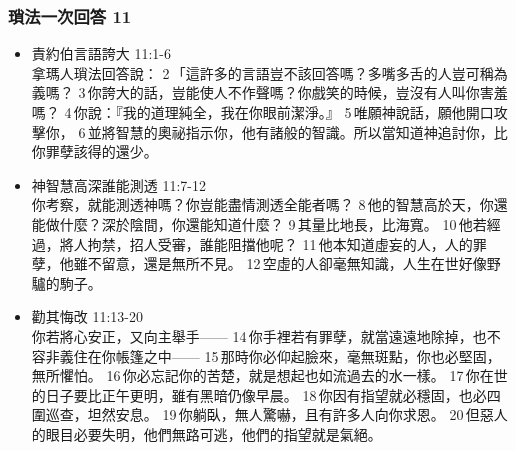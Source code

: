 \subsubsection{瑣法一次回答 11}
\begin{itemize}
\itemsep-.45em 
\item 責約伯言語誇大 11:1-6\\
拿瑪人瑣法回答說： 2 「這許多的言語豈不該回答嗎？多嘴多舌的人豈可稱為義嗎？ 3 你誇大的話，豈能使人不作聲嗎？你戲笑的時候，豈沒有人叫你害羞嗎？ 4 你說：『我的道理純全，我在你眼前潔淨。』 5 唯願神說話，願他開口攻擊你， 6 並將智慧的奧祕指示你，他有諸般的智識。所以當知道神追討你，比你罪孽該得的還少。
\item 神智慧高深誰能測透 11:7-12\\
你考察，就能測透神嗎？你豈能盡情測透全能者嗎？ 8 他的智慧高於天，你還能做什麼？深於陰間，你還能知道什麼？ 9 其量比地長，比海寬。 10 他若經過，將人拘禁，招人受審，誰能阻擋他呢？ 11 他本知道虛妄的人，人的罪孽，他雖不留意，還是無所不見。 12 空虛的人卻毫無知識，人生在世好像野驢的駒子。
\item 勸其悔改 11:13-20\\
你若將心安正，又向主舉手—— 14 你手裡若有罪孽，就當遠遠地除掉，也不容非義住在你帳篷之中—— 15 那時你必仰起臉來，毫無斑點，你也必堅固，無所懼怕。 16 你必忘記你的苦楚，就是想起也如流過去的水一樣。 17 你在世的日子要比正午更明，雖有黑暗仍像早晨。 18 你因有指望就必穩固，也必四圍巡查，坦然安息。 19 你躺臥，無人驚嚇，且有許多人向你求恩。 20 但惡人的眼目必要失明，他們無路可逃，他們的指望就是氣絕。
\end{itemize}

